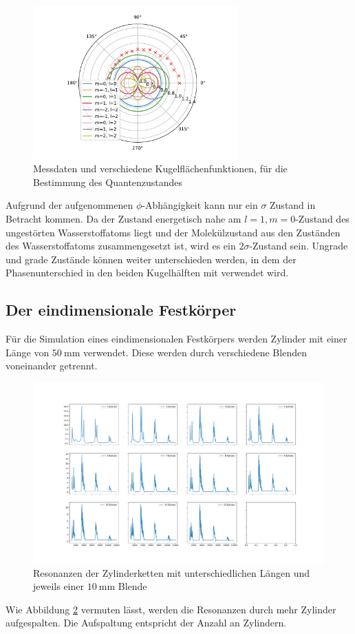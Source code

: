 \begin{figure}
    \centering
    \includegraphics[width = 0.7\textwidth, keepaspectratio]{figure/WMQZ.pdf}
    \caption{Messdaten und verschiedene Kugelflächenfunktionen, für die Bestimmung des Quantenzustandes}
    \label{fig:WMQZ}
\end{figure}
\FloatBarrier
Aufgrund der aufgenommenen $\phi$-Abhängigkeit kann nur ein $\sigma$ Zustand in Betracht kommen.
Da der Zustand energetisch nahe am $l=1,m=0$-Zustand des ungestörten Wasserstoffatoms liegt und der Molekülzustand 
aus den Zuständen des Wasserstoffatoms zusammengesetzt ist, wird es ein $2\sigma$-Zustand sein.
Ungrade und grade Zustände können weiter unterschieden werden, in dem der Phasenunterschied in den beiden Kugelhälften 
mit verwendet wird.

\subsection{Der eindimensionale Festkörper}
Für die Simulation eines eindimensionalen Festkörpers werden Zylinder mit einer 
Länge von $\SI{50}{\milli\meter}$ verwendet. Diese werden durch verschiedene Blenden voneinander getrennt.
\FloatBarrier
\begin{figure}
    \centering
    \includegraphics[width=\textwidth,keepaspectratio]{figure/Zylinder_Ketten.pdf}
    \caption{Resonanzen der Zylinderketten mit unterschiedlichen Längen und jeweils einer $\SI{10}{\milli\meter}$ Blende}
    \label{fig:Zylinder_Ketten}
\end{figure}
\FloatBarrier
Wie Abbildung \ref{fig:Zylinder_Ketten} vermuten lässt, werden die Resonanzen durch mehr Zylinder aufgespalten. Die 
Aufspaltung entspricht der Anzahl an Zylindern.

